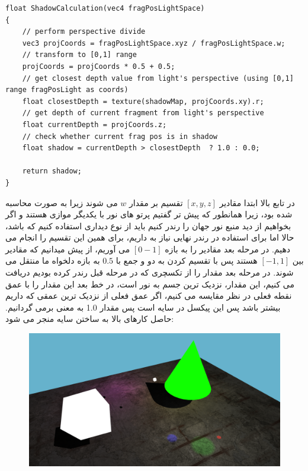 \documentclass[a4paper, 12pt]{report}
\newcommand{\lrit}[1]{\lr{\textit{#1}}}
\begin{document}
    \begin{LTR}
    \small
        \begin{lstlisting}[style=C++Style,caption=\lrit{calculate shadow}]
float ShadowCalculation(vec4 fragPosLightSpace)
{
    // perform perspective divide
    vec3 projCoords = fragPosLightSpace.xyz / fragPosLightSpace.w;
    // transform to [0,1] range
    projCoords = projCoords * 0.5 + 0.5;
    // get closest depth value from light's perspective (using [0,1] range fragPosLight as coords)
    float closestDepth = texture(shadowMap, projCoords.xy).r;
    // get depth of current fragment from light's perspective
    float currentDepth = projCoords.z;
    // check whether current frag pos is in shadow
    float shadow = currentDepth > closestDepth  ? 1.0 : 0.0;

    return shadow;
}
        \end{lstlisting}
    \end{LTR}
    \normalsize
    \vspace*{0.3cm}

     در تابع بالا ابتدا مقادیر
     $[x, y, z]$
     تقسیم بر مقدار
     $w$
     می شوند زیرا  به صورت  محاسبه شده بود، زیرا همانطور که پیش تر گفتیم پرتو های نور با یکدیگر موازی هستند و اگر بخواهیم از دید منبع نور جهان را رندر کنیم باید از نوع دیداری استفاده کنیم که  باشد، حالا اما برای استفاده در رندر نهایی نیاز به  داریم، برای همین این تقسیم را انجام می دهیم. در مرحله بعد مقادیر را به بازه
     $[0-1]$
     می آوریم، از پیش میدانیم که مقادیر بین
     $[-1, 1]$
     هستند پس با تقسیم کردن به دو و جمع با $0.5$ به بازه دلخواه ما منتقل می شوند. در مرحله بعد مقدار  را از تکسچری که در مرحله قبل رندر کرده بودیم دریافت می کنیم، این مقدار، نزدیک ترین جسم به نور است، در خط بعد این مقدار را با عمق نقطه فعلی در نظر مقایسه می کنیم، اگر عمق فعلی از نزدیک ترین عمقی که داریم بیشتر باشد پس این پیکسل در سایه است پس مقدار 1.0 به معنی  برمی گردانیم. حاصل کارهای بالا به ساختن سایه منجر می شود:

\begin{figure}[H]
    \centering
    \href{https://github.com/devprofile98/shm}{
        \includegraphics[width=13cm]{images/sceme-shadow.png}
    }
    \caption{\fontsize{11pt}{1.0cm}\zarbold\textbf{}}
    \label{fig:my_label}
\end{figure}
\end{document}
